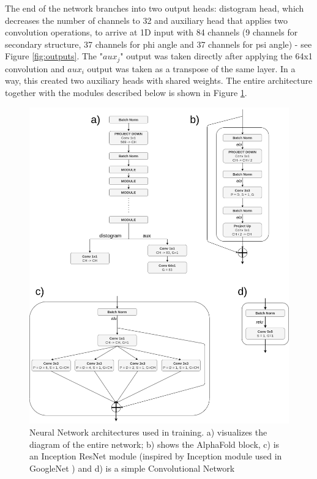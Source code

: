 The end of the network branches into two output heads: distogram head, which decreases the number of channels to 32 and auxiliary head that applies two convolution operations, to arrive at 1D input with 84 channels (9 channels for secondary structure, 37 channels for phi angle and 37 channels for psi angle) - see Figure \ref{fig:outputs}. 
The "$aux_j$" output was taken directly after applying the 64x1 convolution and $aux_i$ output was taken as a transpose of the same layer. 
In a way, this created two auxiliary heads with shared weights. 
The entire architecture together with the modules described below is shown in Figure \ref{fig:architectures}.

\begin{figure}
    \centering
    \includegraphics[width=\linewidth]{imgs_tomas/Architectures.png}
    \caption{Neural Network architectures used in training. a) visualizes the diagram of the entire network; b) shows the AlphaFold block, c) is an Inception ResNet module (inspired by Inception module used in GoogleNet \cite{googlenet}) and d) is a simple Convolutional Network}
    \label{fig:architectures}
\end{figure}


